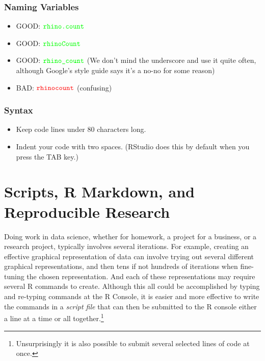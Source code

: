 \documentclass[]{krantz}
\providecommand{\tightlist}{%
  \setlength{\itemsep}{0pt}\setlength{\parskip}{0pt}}
\begin{document}
\hypertarget{naming-variables}{%
\subsection{Naming Variables}\label{naming-variables}}

\begin{itemize}
\tightlist
\item
  GOOD: \(\color{green}{\verb+rhino.count+}\)
\item
  GOOD: \(\color{green}{\verb+rhinoCount+}\)
\item
  GOOD: \(\color{green}{\verb+rhino_count+}\) (We don't mind the underscore and use it quite often, although Google's style guide says it's a no-no for some reason)
\item
  BAD: \(\color{red}{\verb+rhinocount+}\) (confusing)
\end{itemize}

\hypertarget{syntax}{%
\subsection{Syntax}\label{syntax}}

\begin{itemize}
\tightlist
\item
  Keep code lines under 80 characters long.
\item
  Indent your code with two spaces. (RStudio does this by default when you press the TAB key.)
\end{itemize}

\hypertarget{scripts-r-markdown-and-reproducible-research}{%
\chapter{Scripts, R Markdown, and Reproducible Research}\label{scripts-r-markdown-and-reproducible-research}}

Doing work in data science, whether for homework, a project for a business, or a research project, typically involves several iterations. For example, creating an effective graphical representation of data can involve trying out several different graphical representations, and then tens if not hundreds of iterations when fine-tuning the chosen representation. And each of these representations may require several R commands to create. Although this all could be accomplished by typing and re-typing commands at the R Console, it is easier and more effective to write the commands in a \emph{script file} that can then be submitted to the R console either a line at a time or all together.\footnote{Unsurprisingly it is also possible to submit several selected lines of code at once.}
\end{document}
